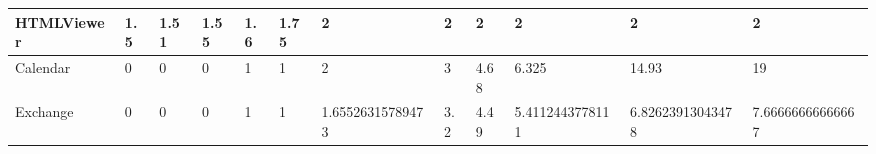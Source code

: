 \documentclass[a4paper]{article}
\begin{document}
\newline
\begin{tabular}{|l|l|l|l|l|l|l|l|l|l|l|l|}
\hline
HTMLViewer&1.5&1.51&1.55&1.6&1.75&2&2&2&2&2&2\\
\hline
Calendar&0&0&0&1&1&2&3&4.68&6.325&14.93&19\\
\hline
Exchange&0&0&0&1&1&1.65526315789473&3.2&4.49&5.4112443778111&6.82623913043478&7.66666666666667\\
\hline
\end{tabular}
\end{document}
